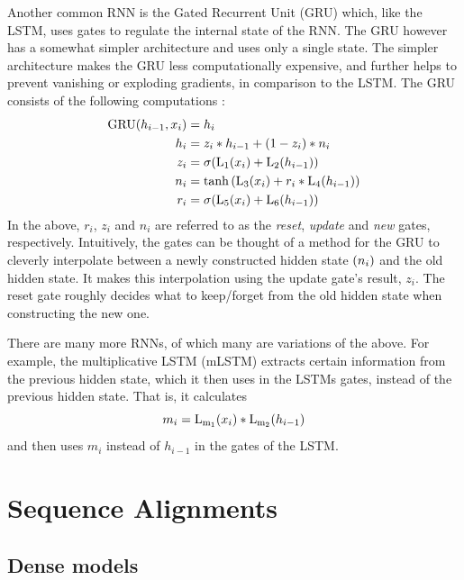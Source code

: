 Another common RNN is the Gated Recurrent Unit (GRU) which, like the LSTM, uses gates to regulate the internal state of the RNN. The GRU however has a somewhat simpler architecture and uses only a single state. The simpler architecture makes the GRU less computationally expensive, and further helps to prevent vanishing or exploding gradients, in comparison to the LSTM. The GRU consists of the following computations \cite{pytorchnn}:
\begin{align*}
    \mathrm{GRU}{\mathopen{} \left( h_{i - 1}, x_i \right) \mathclose{}} &= h_i \\
    h_i &= z_i * h_{i - 1} + {\mathopen{} \left( 1 - z_i \right) \mathclose{}} * n_i  \\
    z_i &= \mathrm{\sigma}{\mathopen{} \left( \mathrm{L_1}{\mathopen{} \left( x_i \right) \mathclose{}} + \mathrm{L_2}{\mathopen{} \left( h_{i - 1} \right) \mathclose{}} \right) \mathclose{}} \\
    n_i &= \tanh{\mathopen{} \left( \mathrm{L_3}{\mathopen{} \left( x_i \right) \mathclose{}} + r_i * \mathrm{L_4}{\mathopen{} \left( h_{i - 1} \right) \mathclose{}} \right) \mathclose{}} \\
    r_i &= \mathrm{\sigma}{\mathopen{} \left( \mathrm{L_5}{\mathopen{} \left( x_i \right) \mathclose{}} + \mathrm{L_6}{\mathopen{} \left( h_{i - 1} \right) \mathclose{}} \right) \mathclose{}}
\end{align*}
In the above, $r_i$, $z_i$ and $n_i$ are referred to as the \textit{reset}, \textit{update} and \textit{new} gates, respectively. Intuitively, the gates can be thought of a method for the GRU to cleverly interpolate between a newly constructed hidden state ${\mathopen{} \left( n_i \right) \mathclose{}}$ and the old hidden state. It makes this interpolation using the update gate's result, $z_i$. The reset gate roughly decides what to keep/forget from the old hidden state when constructing the new one.

There are many more RNNs, of which many are variations of the above. For example, the multiplicative LSTM (mLSTM) \cite{krause2016multiplicative} extracts certain information from the previous hidden state, which it then uses in the LSTMs gates, instead of the previous hidden state. That is, it calculates
\[m_i = \mathrm{L_{m_1}}{\mathopen{} \left( x_i \right) \mathclose{}} * \mathrm{L_{m_2}}{\mathopen{} \left( h_{i - 1} \right) \mathclose{}}\]
and then uses $m_i$ instead of $h_{i - 1}$ in the gates of the LSTM.

\section{Sequence Alignments}
\label{sec:sequence_alignments}


\subsection{Dense models}
